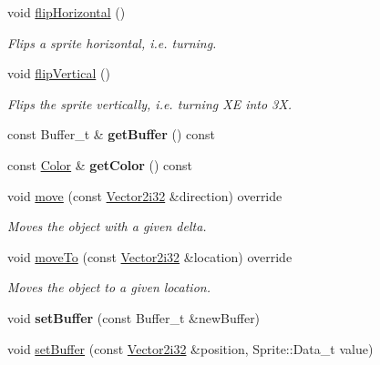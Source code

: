 \begin{DoxyCompactItemize}
void \hyperlink{classmonsterbattle_1_1Sprite_acbe4b309f8cac41f2b29cfcf29227006}{flip\+Horizontal} ()
\begin{DoxyCompactList}\small\item\em Flips a sprite horizontal, i.\+e. turning. \end{DoxyCompactList}\item 
\mbox{\label{classmonsterbattle_1_1Sprite_a9c113cc741ec19b4039f536d040ee6b9}} 
void \hyperlink{classmonsterbattle_1_1Sprite_a9c113cc741ec19b4039f536d040ee6b9}{flip\+Vertical} ()
\begin{DoxyCompactList}\small\item\em Flips the sprite vertically, i.\+e. turning XE into 3X. \end{DoxyCompactList}\item 
\mbox{\label{classmonsterbattle_1_1Sprite_adb5877b18855b183aea977bf0a6e8efd}} 
const Buffer\+\_\+t \& {\bfseries get\+Buffer} () const
\item 
\mbox{\label{classmonsterbattle_1_1Sprite_aef720c85d9830a2a11ddfcaa9c5fe995}} 
const \hyperlink{structmonsterbattle_1_1Color}{Color} \& {\bfseries get\+Color} () const
\item 
void \hyperlink{classmonsterbattle_1_1Sprite_a4eae41525289f126bc83b326c3be7907}{move} (const \hyperlink{structmonsterbattle_1_1Vector}{Vector2i32} \&direction) override
\begin{DoxyCompactList}\small\item\em Moves the object with a given delta. \end{DoxyCompactList}\item 
void \hyperlink{classmonsterbattle_1_1Sprite_adf499d36bc202a30c3313a98d9f93d6f}{move\+To} (const \hyperlink{structmonsterbattle_1_1Vector}{Vector2i32} \&location) override
\begin{DoxyCompactList}\small\item\em Moves the object to a given location. \end{DoxyCompactList}\item 
\mbox{\label{classmonsterbattle_1_1Sprite_a77080b1fb1e3b4568784756914567c85}} 
void {\bfseries set\+Buffer} (const Buffer\+\_\+t \&new\+Buffer)
\item 
void \hyperlink{classmonsterbattle_1_1Sprite_a58a163699896d4199cb4935c44a40d45}{set\+Buffer} (const \hyperlink{structmonsterbattle_1_1Vector}{Vector2i32} \&position, Sprite\+::\+Data\+\_\+t value)

\end{DoxyCompactItemize}
